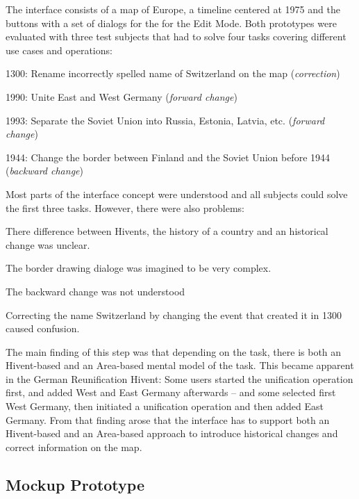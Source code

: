 The interface consists of a map of Europe, a timeline centered at 1975 and the buttons with a set of dialogs for the for the Edit Mode. Both prototypes were evaluated with three test subjects that had to solve four tasks covering different use cases and operations:
\begin{compactenum}
  \item 1300: Rename incorrectly spelled name of Switzerland on the map (\emph{correction})
  \item 1990: Unite East and West Germany (\emph{forward change})
  \item 1993: Separate the Soviet Union into Russia, Estonia, Latvia, etc. (\emph{forward change})
  \item 1944: Change the border between Finland and the Soviet Union before 1944 (\emph{backward change})
\end{compactenum}

Most parts of the interface concept were understood and all subjects could solve the first three tasks. However, there were also problems:

\begin{compactenum}
  \item There difference between Hivents, the history of a country and an historical change was unclear.
  \item The border drawing dialoge was imagined to be very complex.
  \item The backward change was not understood
  \item Correcting the name Switzerland by changing the event that created it in 1300 caused confusion.
\end{compactenum}

The main finding of this step was that depending on the task, there is both an Hivent-based and an Area-based mental model of the task. This became apparent in the German Reunification Hivent: Some users started the unification operation first, and added West and East Germany afterwards -- and some selected first West Germany, then initiated a unification operation and then added East Germany. From that finding arose that the interface has to support both an Hivent-based and an Area-based approach to introduce historical changes and correct information on the map.


\subsection{Mockup Prototype} %
\label{sub:mockup_prototype}

